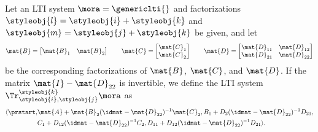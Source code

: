 {    \begin{definition}\label{def:trace-lti}
        Let an LTI system $\mora = \genericlti{}$ and factorizations $\styleobj{l} = \styleobj{i} + \styleobj{k}$ and $\styleobj{m} = \styleobj{j} + \styleobj{k}$ be given, and let
        \begin{equation}\label{eq:LTI-induced-block-forms}
            \mat{B} =
            \begin{bmatrix}
                \mat{B}_1 & \mat{B}_2
            \end{bmatrix}
            \qquad
            \mat{C} =
            \begin{bmatrix}
                \mat{C}_1 \\
                \mat{C}_2
            \end{bmatrix}
            \qquad
            \mat{D} =
            \begin{bmatrix}
                \mat{D}_{11} & \mat{D}_{12} \\
                \mat{D}_{21} & \mat{D}_{22}
            \end{bmatrix}
        \end{equation}
        be the corresponding factorizations of $\mat{B}$, $\mat{C}$, and $\mat{D}$. If the matrix $\mat{I} - \mat{D}_{22}$ is invertible, we define the LTI system $\Tr_{\styleobj{i},\styleobj{j}}^{\styleobj{k}}\mora$ as
        \begin{equation}
            \begin{aligned}
                \langle\prstart, & \mat{A} + \mat{B}_2 (\idmat- \mat{D}_{22})^{-1} \mat{C}_2 , B_1 + D_2(\idmat- \mat{D}_{22})^{-1}
                D_{21}, \\
                                 & C_1 + D_{12}(\idmat- \mat{D}_{22})^{-1}C_2, D_{11} + D_{12}(\idmat- \mat{D}_{22})^{-1}D_{21} \rangle.
            \end{aligned}
        \end{equation}
    \end{definition}

}
